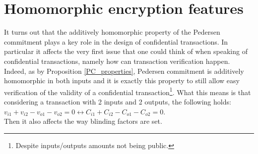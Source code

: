 \section{Homomorphic encryption features}
\label{Homom_encryption_features}
It turns out that the additively homomorphic property of the Pedersen commitment plays a key role in the design of confidential transactions. In particular it affects the very first issue that one could think of when speaking of confidential transactions, namely how can transaction verification happen. Indeed, as by Proposition \ref{PC_properties}, Pedersen commitment is additively homomorphic in both inputs and it is exactly this property to still allow easy verification of the validity of a confidential transaction\footnote{Despite inputs/outputs amounts not being public.}. What this means is that considering a transaction with 2 inputs and 2 outputs, the following holds: $v_{i1} + v_{i2} - v_{o1} - v_{o2} = 0 \leftrightarrow C_{i1} + C_{i2} - C_{o1} - C_{o2} = 0.$   \\
Then it also affects the way blinding factors are set.


